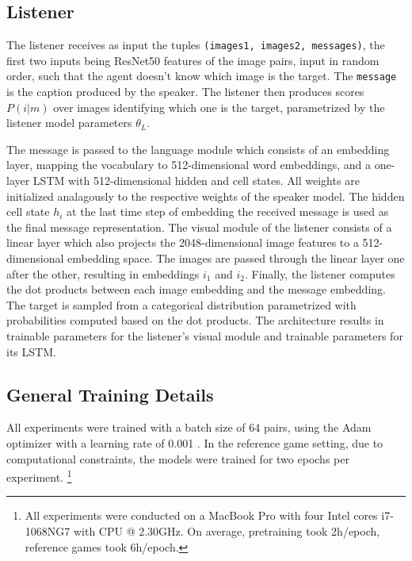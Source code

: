 \subsection{Listener}
The listener receives as input the tuples \texttt{(images1, images2, messages)}, the first two inputs being ResNet50 features of the image pairs, input in random order, such that the agent doesn't know which image is the target. The \texttt{message} is the caption produced by the speaker. The listener then produces scores $P(i|m)$ over images identifying which one is the target, parametrized by the listener model parameters $\theta_L$.

The message is passed to the language module which consists of an embedding layer, mapping the vocabulary to 512-dimensional word embeddings, and a one-layer LSTM with 512-dimensional hidden and cell states. All weights are initialized analagously to the respective weights of the speaker model. The hidden cell state $h_i$ at the last time step of embedding the received message is used as the final message representation. 
The visual module of the listener consists of a linear layer which also projects the 2048-dimensional image features to a 512-dimensional embedding space. The images are passed through the linear layer one after the other, resulting in embeddings $i_1$ and $i_2$. Finally, the listener computes the dot products between each image embedding and the message embedding. The target is sampled from a categorical distribution parametrized with probabilities computed based on the dot products.  
The architecture results in  trainable parameters for the listener's visual module and  trainable parameters for its LSTM.


\subsection{General Training Details}

All experiments were trained with a batch size of 64 pairs, using the Adam optimizer with a learning rate  of 0.001 \parencite{kingma2014adam}. In the reference game setting, due to computational constraints, the models were trained for two epochs per experiment. \footnote{All experiments were conducted on a MacBook Pro with four Intel cores i7-1068NG7 with CPU @ 2.30GHz. On average, pretraining took 2h/epoch, reference games took 6h/epoch.} 

